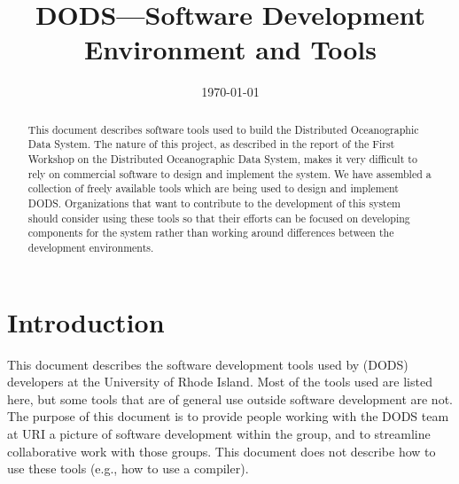 %
%
%








\title{DODS---Software Development Environment and Tools}
\author{}
\date{\today}

\maketitle

\begin{abstract}

  This document describes software tools used to build the Distributed
  Oceanographic Data System. The nature of this project, as described in the
  report of the First Workshop on the Distributed Oceanographic Data System,
  makes it very difficult to rely on commercial software to design and
  implement the system. We have assembled a collection of freely available
  tools which are being used to design and implement DODS\@. Organizations
  that want to contribute to the development of this system should consider
  using these tools so that their efforts can be focused on developing
  components for the system rather than working around differences between
  the development environments.

\end{abstract}



\begin{htmlonly}
\end{htmlonly}

\newpage

\tableofcontents

\newpage

\section{Introduction}
\label{introduction}

This document describes the software development tools used by \DODS
(DODS) developers at the University of Rhode Island. Most of the tools used
are listed here, but some tools that are of general use outside software
development are not. The purpose of this document is to provide people
working with the DODS team at URI a picture of software development within
the group, and to streamline collaborative work with those groups.  This
document does not describe how to use these tools (e.g., how to use a \Cpp
compiler). 


